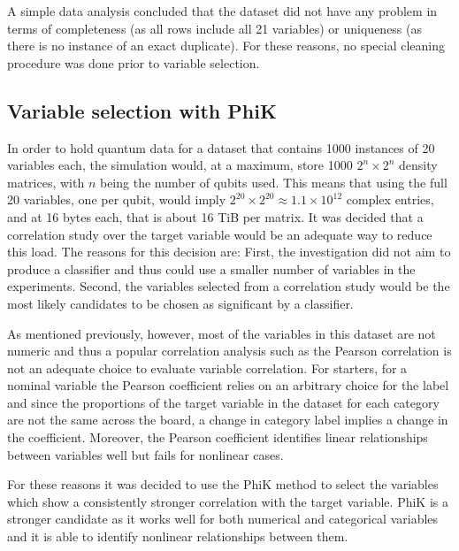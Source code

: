 \documentclass{ieeeaccess}
\begin{document}
A simple data analysis concluded that the dataset did not have any problem in terms of completeness (as all rows include all 21 variables) or uniqueness (as there is no instance of an exact duplicate). For these reasons, no special cleaning procedure was done prior to variable selection.

\subsection{Variable selection with PhiK}
\label{subsec:var_selection}

In order to hold quantum data for a dataset that contains 1000 instances of 20 variables each, the simulation would, at a maximum, store 1000 $2^n \times 2^n$ density matrices, with $n$ being the number of qubits used. This means that using the full 20 variables, one per qubit, would imply $2^{20} \times 2^{20} \approx 1.1 \times 10^{12}$ complex entries, and at 16 bytes each, that is about 16 TiB per matrix. It was decided that a correlation study over the target variable would be an adequate way to reduce this load. The reasons for this decision are: First, the investigation did not aim to produce a classifier and thus could use a smaller number of variables in the experiments. Second, the variables selected from a correlation study would be the most likely candidates to be chosen as significant by a classifier.

As mentioned previously, however, most of the variables in this dataset are not numeric and thus a popular correlation analysis such as the Pearson correlation is not an adequate choice to evaluate variable correlation. For starters, for a nominal variable the Pearson coefficient relies on an arbitrary choice for the label and since the proportions of the target variable in the dataset for each category are not the same across the board, a change in category label implies a change in the coefficient. Moreover, the Pearson coefficient identifies linear relationships between variables well but fails for nonlinear cases.

For these reasons it was decided to use the PhiK method \cite{BAAK2020107043PHIK} to select the variables which show a consistently stronger correlation with the target variable. PhiK is a stronger candidate as it works well for both numerical and categorical variables and it is able to identify nonlinear relationships between them.
\end{document}
